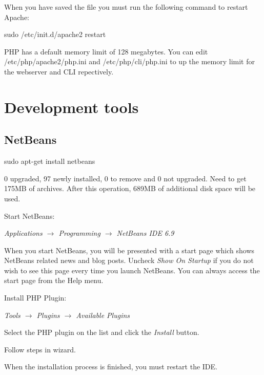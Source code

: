 \documentclass[draft,ebook,10pt,twoside,openright]{memoir}
\begin{document}

When you have saved the file you must run the following command to restart Apache:

\begin{squashboxcommand}
sudo /etc/init.d/apache2 restart
\end{squashboxcommand}

PHP has a default memory limit of 128 megabytes. You can edit /etc/php/apache2/php.ini and /etc/php/cli/php.ini to up the memory limit for the webserver and CLI repectively.

\chapter{Development tools} \label{chdevtools}

\section{NetBeans}

\begin{squashboxcommand}
sudo apt-get install netbeans
\end{squashboxcommand}

0 upgraded, 97 newly installed, 0 to remove and 0 not upgraded.
Need to get 175MB of archives.
After this operation, 689MB of additional disk space will be used.

Start NetBeans:

\emph{Applications $\rightarrow$ Programming $\rightarrow$ NetBeans IDE 6.9}

When you start NetBeans, you will be presented with a start page which shows NetBeans related news and blog posts. Uncheck \emph{Show On Startup} if you do not wish to see this page every time you launch NetBeans. You can always access the start page from the Help menu.

Install PHP Plugin:

\emph{Tools $\rightarrow$ Plugins $\rightarrow$ Available Plugins}

Select the PHP plugin on the list and click the \emph{Install} button.

Follow steps in wizard.

When the installation process is finished, you must restart the IDE.
\end{document}
